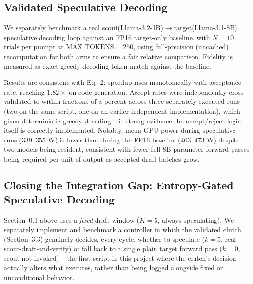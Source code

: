 \documentclass[10pt,journal,compsoc,twocolumn]{IEEEtran}
\begin{document}
\subsection{Validated Speculative Decoding}
\label{sec:spec_results}
We separately benchmark a real scout(Llama-3.2-1B)$\to$target(Llama-3.1-8B) speculative decoding loop against an FP16 target-only baseline, with $N{=}10$ trials per prompt at $\text{MAX\_TOKENS}{=}250$, using full-precision (uncached) recomputation for both arms to ensure a fair relative comparison. Fidelity is measured as exact greedy-decoding token match against the baseline.

\begin{table}[t]
\caption{Speculative Decoding vs. FP16 Baseline, RTX 5090 Blackwell ($N{=}10$ trials/prompt, $100\%$ fidelity on all rows). J/tok values are mean $\pm$ std. dev.}
\label{tab:spec_results}
\centering
{}
\end{table}

Results are consistent with Eq.~2: speedup rises monotonically with acceptance rate, reaching $1.82\times$ on code generation. Accept rates were independently cross-validated to within fractions of a percent across three separately-executed runs (two on the same script, one on an earlier independent implementation), which -- given deterministic greedy decoding -- is strong evidence the accept/reject logic itself is correctly implemented. Notably, mean GPU power during speculative runs ($339$--$355\text{ W}$) is lower than during the FP16 baseline ($463$--$473\text{ W}$) despite two models being resident, consistent with fewer full 8B-parameter forward passes being required per unit of output as accepted draft batches grow.

\subsection{Closing the Integration Gap: Entropy-Gated Speculative Decoding}
\label{sec:entropy_gated_spec}
Section~\ref{sec:spec_results} above uses a \textit{fixed} draft window ($K{=}5$, always speculating). We separately implement and benchmark a controller in which the validated clutch (Section~3.3) genuinely decides, every cycle, whether to speculate ($k{=}5$, real scout-draft-and-verify) or fall back to a single plain target forward pass ($k{=}0$, scout not invoked) -- the first script in this project where the clutch's decision actually alters what executes, rather than being logged alongside fixed or unconditional behavior.
\end{document}
